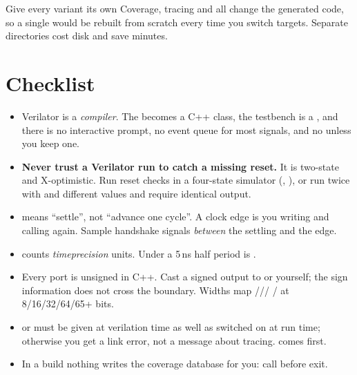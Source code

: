 \begin{tipbox}{Give every variant its own }
Coverage, tracing and  all change the generated code, so a
single  would be rebuilt from scratch every time you switch
targets. Separate directories cost disk and save minutes.
\end{tipbox}

\section{Checklist}
\label{sec:verilator:checklist}

\begin{itemize}
  \item Verilator is a \emph{compiler}. The \DUT{} becomes a C++ class, the
        testbench is a , and there is no interactive prompt, no
        event queue for most signals, and no  unless you keep one.
  \item \textbf{Never trust a Verilator run to catch a missing reset.} It is
        two-state and X-optimistic. Run reset checks in a four-state simulator
        (, ), or run twice with
         and different
         values and require identical output.
  \item {} means ``settle'', not ``advance one cycle''. A clock edge
        is you writing  and calling  again. Sample
        handshake signals \emph{between} the settling  and the
        edge.
  \item {} counts \emph{timeprecision} units. Under
         a 5\,ns half period is .
  \item Every port is unsigned in C++. Cast a signed output to 
        or  yourself; the \SV{} sign information does not cross
        the boundary. Widths map ///
        / at 8/16/32/64/65+ bits.
  \item {} or  must be given at verilation
        time as well as switched on at run time; otherwise you get a link
        error, not a message about tracing.  comes
        first.
  \item In a  build nothing writes the coverage database for you:
        call  before exit.

\end{itemize}
